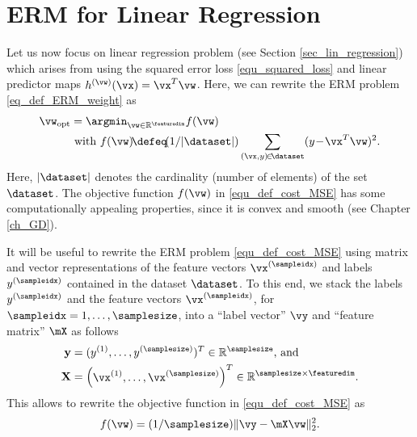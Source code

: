 \documentclass[12pt]{report}
\begin{document}
\section{ERM for Linear Regression}
\label{sec_ERM_lin_reg}

Let us now focus on linear regression problem (see Section \ref{sec_lin_regression}) which arises from using the 
squared error loss \eqref{equ_squared_loss} and linear predictor maps $h^{(\vw)}(\vx) = \vx^{T} \vw$. 
Here, we can rewrite the ERM problem \eqref{eq_def_ERM_weight} as 
\begin{align}
\label{equ_def_cost_MSE}
\vw_{\rm opt} & = \argmin_{\vw \in \mathbb{R}^{\featuredim}} f(\vw) \nonumber \\ 
& \mbox{ with } f(\vw)\!\defeq\!(1/|\dataset|) \sum_{(\vx,y)\!\in\!\dataset} (y \!-\! \vx^{T} \vw )^2.
\end{align} 
Here, $|\dataset|$ denotes the cardinality (number of elements) of the set $\dataset$. 
The objective function $f(\vw)$ in \eqref{equ_def_cost_MSE} has some computationally 
appealing properties, since it is convex and smooth (see Chapter \ref{ch_GD}). 

It will be useful to rewrite the ERM problem \eqref{equ_def_cost_MSE} using matrix 
and vector representations of the feature vectors $\vx^{(\sampleidx)}$ and labels 
$y^{(\sampleidx)}$ contained in the dataset $\dataset$. To this end, we stack the 
labels $y^{(\sampleidx)}$ and the feature vectors $\vx^{(\sampleidx)}$, for 
$\sampleidx=1,\ldots,\samplesize$, into a ``label vector'' $\vy$ and ``feature matrix'' $\mX$ as follows
\begin{align}
\label{equ_def_vec_matrix}
\mathbf{y} & = ( y^{(1)},\ldots, y^{(\samplesize)})^{T} \in \mathbb{R}^{\samplesize} \mbox{, and } \nonumber \\ 
\mathbf{X} & = \begin{pmatrix} \vx^{(1)},\ldots,\vx^{(\samplesize)} \end{pmatrix}^{T}\in \mathbb{R}^{\samplesize \times \featuredim}.
\end{align}
This allows to rewrite the objective function in \eqref{equ_def_cost_MSE} as 
\begin{equation}
\label{equ_min_lin_pred_vec_mat}
f(\vw) = (1/\samplesize) \| \vy - \mX\vw \|^{2}_{2}.
\end{equation} 
\end{document}

